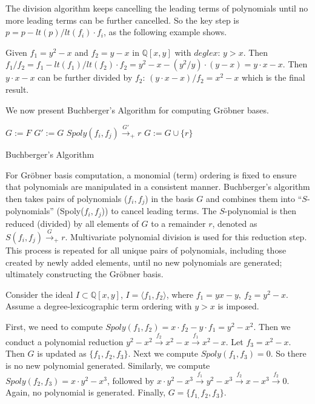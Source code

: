 The division algorithm keeps cancelling the leading terms of polynomials until no more leading terms can be further cancelled.
So the key step is $p=p-lt(p)/lt(f_{i}) \cdot f_{i}$, as the following example shows.
\begin{Example}
	Given $f_{1} = y^{2}-x$ and $f_{2} = y - x$ in $\mathbb{Q}[x,y]$ with $deglex$: $y>x$. 
Then $f_{1}/f_{2}=f_{1}-lt(f_{1})/lt(f_{2}) \cdot f_{2}=y^{2}-x-(y^{2} /y) \cdot (y-x)=y\cdot x-x$.
Then $y\cdot x-x$ can be further divided by $f_{2}$: $(y\cdot x-x)/f_{2}=x^{2}-x$ which is the final result.
\end{Example}

We now present Buchberger's Algorithm \cite{buchberger_thesis} for computing Gr\"obner
bases. 

\begin{algorithm}[hbt]
\SetAlgoNoLine
  $G:= F$\;
  {
  	$G' := G$\;
	{
		$Spoly(f_{i}, f_{j}) \stackrel{G'}{\textstyle\longrightarrow}_+r$ \;
		{
			$G:= G \cup \{r\}$ \;
		}
	}
   }
\caption {Buchberger's Algorithm}\label{alg:gb}
\end{algorithm}


For Gr\"obner basis computation, a monomial (term) ordering is
fixed to ensure that polynomials are manipulated in a consistent manner. 
Buchberger's algorithm then takes pairs of polynomials ($f_{i}, f_{j}$) in the basis $G$
and combines them into ``$S$-polynomials'' (Spoly($f_{i}, f_{j}$)) to cancel leading terms. The
$S$-polynomial is then reduced (divided) by all elements of $G$ to a
remainder $r$, denoted as  $S(f_{i}, f_{j}) \stackrel{G}{\textstyle\longrightarrow}_+r$. 
Multivariate polynomial division is used for this reduction step. This
process is repeated for all unique pairs of polynomials, including
those created by newly added elements, until no new polynomials are
generated; ultimately constructing the Gr\"{o}bner basis.

\begin{Example}\label{exp:gbsimple}
Consider the ideal $I \subset \mathbb{Q}[x, y]$, $I = \langle f_1, f_2 \rangle$,
where $f_1 = yx - y, ~f_2 = y^2 - x$. Assume a degree-lexicographic term ordering with $y > x$ is imposed. 

First, we need to compute $Spoly(f_{1},f_{2})=x\cdot f_{2}-y\cdot f_{1}=y^{2}-x^{2}$.
Then we conduct a polynomial reduction 
$y^{2}-x^{2}\stackrel{f_{2}}{\textstyle\longrightarrow}x^{2}-x \stackrel{f_{1}}{\textstyle\longrightarrow}x^{2}-x$.
Let $f_{3}=x^{2}-x$. Then $G$ is updated as $\{f_{1},f_{2},f_{3}\}$. Next we compute $Spoly(f_{1},f_{3})=0$. So there
is no new polynomial generated. Similarly, we compute $Spoly(f_{2},f_{3})=x\cdot y^{2}-x^{3}$, followed by 
$x\cdot y^{2}-x^{3}\stackrel{f_{1}}{\textstyle\longrightarrow}y^{2}-x^{3} \stackrel{f_{2}}{\textstyle\longrightarrow}x-x^{3}
\stackrel{f_{2}}{\textstyle\longrightarrow}0$. Again, no polynomial is generated. Finally, $G=\{f_{1,}f_{2},f_{3}\}$.

\end{Example}


